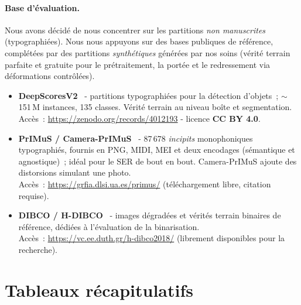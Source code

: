 \documentclass[a4paper,10pt]{article}
\begin{document}
\paragraph{Base d'évaluation.}
Nous avons décidé de nous concentrer sur les partitions \emph{non manuscrites} (typographiées). Nous nous appuyons sur des bases publiques de référence, complétées par des partitions \emph{synthétiques} générées par nos soins (vérité terrain parfaite et gratuite pour le prétraitement, la portée et le redressement via déformations contrôlées).

\begin{itemize}
  \item \textbf{DeepScoresV2}~\cite{tuggener2020deepscores} - partitions typographiées pour la détection d'objets~; $\sim$151\,M instances, 135 classes. Vérité terrain au niveau boîte et segmentation.\\
  Accès~: \url{https://zenodo.org/records/4012193} - licence \textbf{CC BY 4.0}.
  \item \textbf{PrIMuS / Camera-PrIMuS}~\cite{calvozaragoza2018primus} - 87\,678 \emph{incipits} monophoniques typographiés, fournis en PNG, MIDI, MEI et deux encodages (sémantique et agnostique)~; idéal pour le SER de bout en bout. Camera-PrIMuS ajoute des distorsions simulant une photo.\\
  Accès~: \url{https://grfia.dlsi.ua.es/primus/} (téléchargement libre, citation requise).
  \item \textbf{DIBCO / H-DIBCO}~\cite{dibco2011} - images dégradées et vérités terrain binaires de référence, dédiées à l'évaluation de la binarisation.\\
  Accès~: \url{https://vc.ee.duth.gr/h-dibco2018/} (librement disponibles pour la recherche).
\end{itemize}

\section*{Tableaux récapitulatifs}
\renewcommand{\arraystretch}{0.95}
\setlength{\tabcolsep}{4pt}
\small
\end{document}
